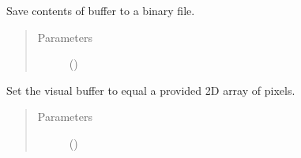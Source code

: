 \documentclass[letterpaper,10pt,english,openany,oneside]{sphinxmanual}
\begin{document}
\begin{fulllineitems}
\begin{fulllineitems}
\begin{quote}
\begin{description}
\end{description}\end{quote}

\end{fulllineitems}


\begin{fulllineitems}
\label{\detokenize{dpav:dpav.vbuffer.VBuffer.save_buffer_to_file}}
\sphinxAtStartPar
Save contents of buffer to a binary file.
\begin{quote}\begin{description}
\item[{Parameters}] \leavevmode
\sphinxAtStartPar
{} () \textendash{} 

\end{description}\end{quote}

\end{fulllineitems}


\begin{fulllineitems}
\label{\detokenize{dpav:dpav.vbuffer.VBuffer.set_buffer}}
\sphinxAtStartPar
Set the visual buffer to equal a provided 2D array of pixels.
\begin{quote}\begin{description}
\item[{Parameters}] \leavevmode
\sphinxAtStartPar
{} () \textendash{} 

\end{description}\end{quote}

\end{fulllineitems}


\end{fulllineitems}
\end{document}

